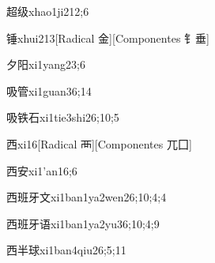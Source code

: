 
\begin{verbete}{超级}{xhao1ji2}{12;6}
\end{verbete}

\begin{verbete}{锤}{xhui2}{13}[Radical 金][Componentes 钅垂]
\end{verbete}

\begin{verbete}{夕阳}{xi1yang2}{3;6}
\end{verbete}

\begin{verbete}{吸管}{xi1guan3}{6;14}
\end{verbete}

\begin{verbete}{吸铁石}{xi1tie3shi2}{6;10;5}
\end{verbete}

\begin{verbete}{西}{xi1}{6}[Radical 襾][Componentes 兀囗]
\end{verbete}

\begin{verbete}{西安}{xi1'an1}{6;6}
\end{verbete}

\begin{verbete}{西班牙文}{xi1ban1ya2wen2}{6;10;4;4}
\end{verbete}

\begin{verbete}{西班牙语}{xi1ban1ya2yu3}{6;10;4;9}
\end{verbete}

\begin{verbete}{西半球}{xi1ban4qiu2}{6;5;11}
\end{verbete}

